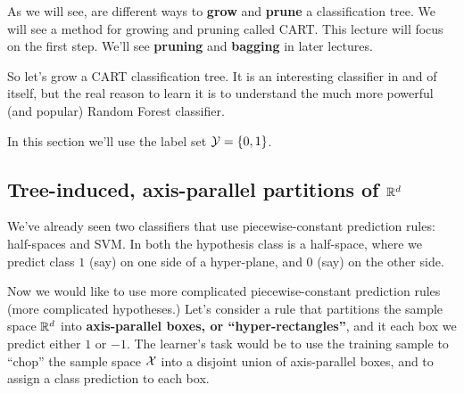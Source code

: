   As we will see,  are different ways to {\bf grow} and {\bf prune} a
  classification tree. We will see a method for growing and pruning called CART.
  This lecture will focus on the first step. We'll see {\bf pruning} and {\bf bagging} in later lectures.
 
  So let's grow a CART classification tree. It is an interesting classifier in and of itself,
  but the real reason to learn it is to understand the much more powerful (and
  popular) Random
  Forest classifier. 

  In this section we'll use the label set $\mathcal{Y}=\left\{ 0,1 \right\}$.

  \subsection{Tree-induced,  axis-parallel partitions of $\mathbb{R}^d$}

 We've already seen two classifiers that use piecewise-constant prediction
 rules: half-spaces and SVM. In both the hypothesis class is a half-space, where
 we predict class $1$ (say) on one side of a hyper-plane, and $0$ (say) on the
 other side. 

 Now we would like to use more complicated piecewise-constant prediction rules
 (more complicated hypotheses.) Let's consider a rule that partitions the
 sample space $\mathbb{R}^d$ into {\bf axis-parallel boxes, or ``hyper-rectangles''}, and it each
 box we predict either $1$ or $-1$. The learner's task would be to use the
 training sample to 
 ``chop'' the sample space $\mathcal{X}$ into a disjoint union of axis-parallel boxes, and
 to assign a class prediction to each box. 

